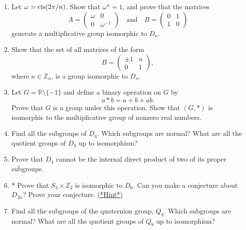 {\small
\begin{enumerate}[(1)]
 
 
\item
Let $\omega = \operatorname{cis}(2 \pi /n)$.  Show that $\omega^n = 1$, and  prove that the matrices 
\[
A=
\begin{pmatrix}
\omega & 0 \\
0 & \omega^{-1}
\end{pmatrix}
\quad \text{and} \quad
B =
\begin{pmatrix}
0 & 1 \\
1 & 0
\end{pmatrix}
\]
generate a multiplicative group isomorphic to $D_n$.
 

\item
Show that the set of all matrices of the form
\[
B =
\begin{pmatrix}
\pm 1 & n \\
0 & 1
\end{pmatrix},
\]
where $n \in {\mathbb Z}_n$, is a group isomorphic to $D_n$. 


\item
Let $G = {\mathbb R} \setminus \{ -1 \}$ and define a binary operation on
$G$ by 
\[
a \ast b = a + b + ab.
\]
Prove that $G$ is a group under this operation. Show that $(G, *)$ is
isomorphic to the multiplicative group of nonzero real numbers.
  
\item
Find all the subgroups of $D_4$. Which subgroups are normal? What are
all the quotient groups of $D_4$ up to isomorphism?


\item
Prove that $D_4$ cannot be the internal direct product of two of its
proper subgroups. 
 

\item \label{exercise:Isomorphism:eoc}
* Prove that $S_3 \times {\mathbb Z}_2$ is isomorphic to $D_6$. Can you
make a conjecture about $D_{2n}$? Prove your conjecture. 
\hyperref[sec:Isomorphism:hints]{(*Hint*)}
 


\item
Find all the subgroups of the quaternion group, $Q_8$. Which subgroups
are normal? What are all the quotient groups of $Q_8$ up to isomorphism?


 


\end{enumerate}}
